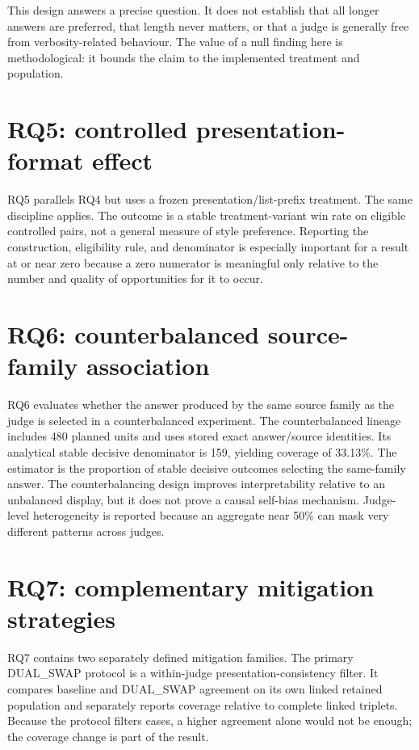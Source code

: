This design answers a precise question. It does not establish that all longer answers are preferred, that length never matters, or that a judge is generally free from verbosity-related behaviour. The value of a null finding here is methodological: it bounds the claim to the implemented treatment and population.

\section{RQ5: controlled presentation-format effect}

RQ5 parallels RQ4 but uses a frozen presentation/list-prefix treatment. The same discipline applies. The outcome is a stable treatment-variant win rate on eligible controlled pairs, not a general measure of style preference. Reporting the construction, eligibility rule, and denominator is especially important for a result at or near zero because a zero numerator is meaningful only relative to the number and quality of opportunities for it to occur.

\section{RQ6: counterbalanced source-family association}

RQ6 evaluates whether the answer produced by the same source family as the judge is selected in a counterbalanced experiment. The counterbalanced lineage includes 480 planned units and uses stored exact answer/source identities. Its analytical stable decisive denominator is 159, yielding coverage of 33.13\%. The estimator is the proportion of stable decisive outcomes selecting the same-family answer. The counterbalancing design improves interpretability relative to an unbalanced display, but it does not prove a causal self-bias mechanism. Judge-level heterogeneity is reported because an aggregate near 50\% can mask very different patterns across judges.

\section{RQ7: complementary mitigation strategies}

RQ7 contains two separately defined mitigation families. The primary DUAL\_SWAP protocol is a within-judge presentation-consistency filter. It compares baseline and DUAL\_SWAP agreement on its own linked retained population and separately reports coverage relative to complete linked triplets. Because the protocol filters cases, a higher agreement alone would not be enough; the coverage change is part of the result.

